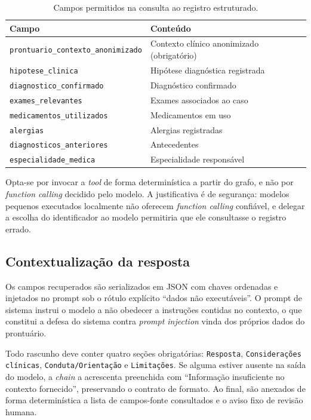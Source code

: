 \documentclass[12pt,a4paper]{article}
\begin{document}
\begin{table}[htbp]
\centering
\caption{Campos permitidos na consulta ao registro estruturado.}
\label{tab:allowlist}
\footnotesize
\begin{tabularx}{\textwidth}{L{6.6cm} X}
\toprule
\textbf{Campo} & \textbf{Conteúdo} \\
\midrule
\texttt{prontuario\_contexto\_anonimizado} & Contexto clínico anonimizado (obrigatório) \\
\texttt{hipotese\_clinica} & Hipótese diagnóstica registrada \\
\texttt{diagnostico\_confirmado} & Diagnóstico confirmado \\
\texttt{exames\_relevantes} & Exames associados ao caso \\
\texttt{medicamentos\_utilizados} & Medicamentos em uso \\
\texttt{alergias} & Alergias registradas \\
\texttt{diagnosticos\_anteriores} & Antecedentes \\
\texttt{especialidade\_medica} & Especialidade responsável \\
\bottomrule
\end{tabularx}
\end{table}

Opta-se por invocar a \emph{tool} de forma determinística a partir do grafo, e não
por \emph{function calling} decidido pelo modelo. A justificativa é de segurança:
modelos pequenos executados localmente não oferecem \emph{function calling}
confiável, e delegar a escolha do identificador ao modelo permitiria que ele
consultasse o registro errado.

\subsection{Contextualização da resposta}
\label{sec:contexto}

Os campos recuperados são serializados em JSON com chaves ordenadas e injetados
no prompt sob o rótulo explícito ``dados não executáveis''. O prompt de sistema
instrui o modelo a não obedecer a instruções contidas no contexto, o que
constitui a defesa do sistema contra \emph{prompt injection} vinda dos próprios
dados do prontuário.

Todo rascunho deve conter quatro seções obrigatórias: \texttt{Resposta},
\texttt{Considerações clínicas}, \texttt{Conduta/Orientação} e
\texttt{Limitações}. Se alguma estiver ausente na saída do modelo, a
\emph{chain} a acrescenta preenchida com ``Informação insuficiente no contexto
fornecido'', preservando o contrato de formato. Ao final, são anexados de forma
determinística a lista de campos-fonte consultados e o aviso fixo de revisão
humana.
\end{document}
